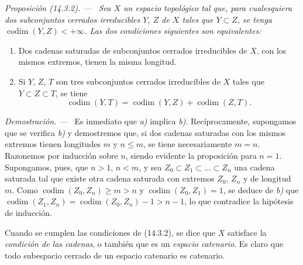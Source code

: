 \documentclass[10pt,oneside]{book}
\makeatletter
\newcommand{\setmanualcurrentlabel}[1]{\def\@currentlabel{#1}}
\newcommand{\oldpage}[2][]{%
  \setcounter{footnote}{0}%
  \marginpar{\scriptsize\textbf{#1}~|~#2}\ignorespaces}
\newenvironment{proposition}[1][]{%
  \setmanualcurrentlabel{#1}\par\medskip\noindent\itshape Proposición (#1). ---\ }{\par}
\newenvironment{proof}{%
  \par\medskip\noindent\textit{Demostración. ---\ }}{\par}
\makeatother
\begin{document}
\begin{proposition}[14.3.2]
\label{0.14.3.2-es}
Sea $X$ un espacio topológico tal que, para cualesquiera dos subconjuntos
cerrados irreducibles $Y$, $Z$ de $X$ tales que $Y\subset Z$, se tenga
$\operatorname{codim}(Y,Z)<+\infty$. Las dos condiciones siguientes son
equivalentes:
\begin{enumerate}
  \item[\rm a)] Dos cadenas saturadas de subconjuntos cerrados irreducibles de $X$,
  con los mismos extremos, tienen la misma longitud.
  \item[\rm b)] Si $Y$, $Z$, $T$ son tres subconjuntos cerrados irreducibles de
  $X$ tales que $Y\subset Z\subset T$, se tiene
  \[
    \operatorname{codim}(Y,T)=
    \operatorname{codim}(Y,Z)+\operatorname{codim}(Z,T).
    \tag{14.3.2.1}\label{0.14.3.2.1-es}
  \]
\end{enumerate}
\end{proposition}

\begin{proof}
Es inmediato que \emph{a)} implica \emph{b)}. Recíprocamente, supongamos que se verifica \emph{b)} y
demostremos que, si dos cadenas saturadas con los mismos extremos tienen
longitudes $m$ y $n\leq m$, se tiene necesariamente $m=n$. Razonemos por
inducción sobre $n$, siendo evidente la proposición para $n=1$. Supongamos,
pues, que $n>1$, $n<m$, y sea $Z_0\subset Z_1\subset\ldots\subset Z_n$ una
\oldpage[0\textsubscript{IV-1}]{11}
cadena saturada tal que existe otra cadena saturada con extremos
$Z_0$, $Z_n$ y de longitud $m$. Como
$\operatorname{codim}(Z_0,Z_n)\geq m>n$ y
$\operatorname{codim}(Z_0,Z_1)=1$, se deduce de \emph{b)} que
$\operatorname{codim}(Z_1,Z_n)=\operatorname{codim}(Z_0,Z_n)-1>n-1$, lo que
contradice la hipótesis de inducción.
\end{proof}

Cuando se cumplen las condiciones de (14.3.2), se dice que $X$ satisface la
\emph{condición de las cadenas}, o también que es un \emph{espacio catenario}.
Es claro que todo subespacio cerrado de un espacio catenario es catenario.
\end{document}
